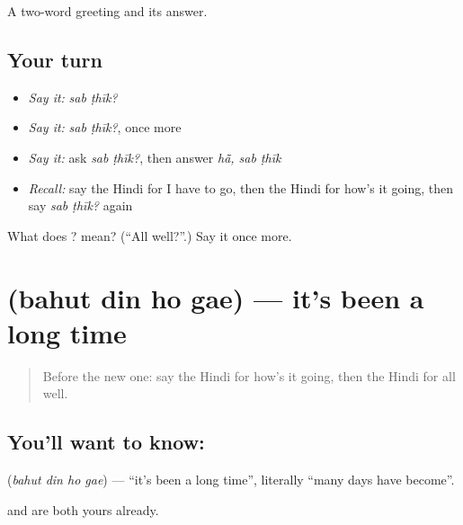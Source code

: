 \begin{grammarlens}[title={What you've built}]
A two-word greeting and its answer.
\end{grammarlens}

\subsection*{Your turn}
\begin{itemize}
\raggedright
  \item \emph{Say it:} \emph{sab ṭhīk?}
  \item \emph{Say it:} \emph{sab ṭhīk?}, once more
  \item \emph{Say it:} ask \emph{sab ṭhīk?}, then answer \emph{hā̃, sab ṭhīk}
  \item \emph{Recall:} say the Hindi for I have to go, then the Hindi for how's it going, then say \emph{sab ṭhīk?} again
\end{itemize}

\begin{tcolorbox}[breakable,colback=teal!4,colframe=teal!35!black,title={Before you move on}]
What does  ? mean? (\textquotedblleft{}All well?\textquotedblright{}.) Say it once more.
\end{tcolorbox}
\section[\texorpdfstring{\hi{बहुत} \hi{दिन} \hi{हो} \hi{गए} (bahut din ho gae)}{बहुत दिन हो गए (bahut din ho gae)}]{    (bahut din ho gae) — it's been a long time}

\label{lesson:HI-C123-bahutdin}



\begin{quote}
Before the new one: say the Hindi for how's it going, then the Hindi for all well.
\end{quote}

\subsection*{You'll want to know:    }
\textbf{   } (\emph{bahut din ho gae}) — \textquotedblleft{}it's been a long time\textquotedblright{}, literally \textquotedblleft{}many days have become\textquotedblright{}.

\textbf{} and \textbf{} are both yours already.

